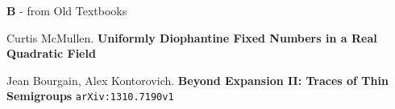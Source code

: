 \documentclass[12pt]{article}
\begin{document}
\newpage

\noindent \textbf{B} - from Old Textbooks


\newpage

\selectfont \fontsize{12}{10}\selectfont

\begin{thebibliography}{}

\item Curtis McMullen.  \textbf{Uniformly Diophantine Fixed Numbers in a Real Quadratic Field}

\item Jean Bourgain, Alex Kontorovich.
\textbf{Beyond Expansion II: Traces of Thin Semigroups} \texttt{arXiv:1310.7190v1}

\end{thebibliography}
\end{document}
